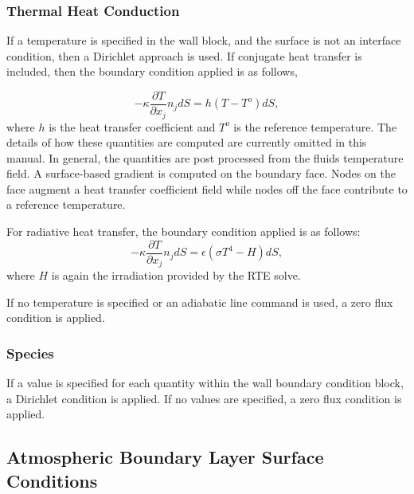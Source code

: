 \subsubsection{Thermal Heat Conduction}
If a temperature is specified in the wall block, and the surface is not an interface condition, then a Dirichlet
approach is used. If conjugate heat transfer is included, then
the boundary condition applied is as follows,

\begin{equation}
     -\kappa \frac{\partial T} {\partial x_j} n_j dS = h(T-T^o)dS,
\end{equation}
where $h$ is the heat transfer coefficient and $T^o$ is the reference
temperature. The details of how these quantities are computed are currently omitted
in this manual. In general, the quantities are post processed from the fluids temperature field. A surface-based
gradient is computed on the boundary face. Nodes on the face augment a heat transfer coefficient field while
nodes off the face contribute to a reference temperature. 

For radiative heat transfer, the boundary condition 
applied is as follows:
\begin{equation}
     -\kappa \frac{\partial T} {\partial x_j} n_j dS = \epsilon (\sigma T^4 - H) dS,
\end{equation}
where $H$ is again the irradiation provided by the RTE solve.

If no temperature is specified or an adiabatic line command is used, a zero flux condition is applied.

\subsubsection{Species}
If a value is specified for each quantity within the wall boundary condition block, a Dirichlet condition
is applied. If no values are specified, a zero flux condition is applied.

\subsection{Atmospheric Boundary Layer Surface Conditions}
